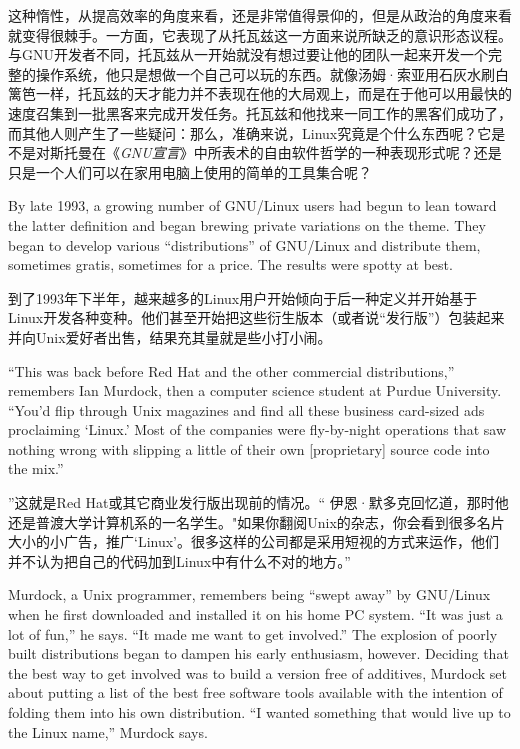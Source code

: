 \ifdefined\chs
这种惰性，从提高效率的角度来看，还是非常值得景仰的，但是从政治的角度来看就变得很棘手。一方面，它表现了从托瓦兹这一方面来说所缺乏的意识形态议程。与GNU开发者不同，托瓦兹从一开始就没有想过要让他的团队一起来开发一个完整的操作系统，他只是想做一个自己可以玩的东西。就像汤姆·索亚用石灰水刷白篱笆一样，托瓦兹的天才能力并不表现在他的大局观上，而是在于他可以用最快的速度召集到一批黑客来完成开发任务。托瓦兹和他找来一同工作的黑客们成功了，而其他人则产生了一些疑问：那么，准确来说，Linux究竟是个什么东西呢？它是不是对斯托曼在《\textit{GNU宣言}》中所表术的自由软件哲学的一种表现形式呢？还是只是一个人们可以在家用电脑上使用的简单的工具集合呢？
\fi

\ifdefined\eng
By late 1993, a growing number of GNU/Linux users had begun to lean toward the latter definition and began brewing private variations on the theme. They began to develop various ``distributions'' of GNU/Linux and distribute them, sometimes gratis, sometimes for a price. The results were spotty at best.
\fi

\ifdefined\chs
到了1993年下半年，越来越多的Linux用户开始倾向于后一种定义并开始基于Linux开发各种变种。他们甚至开始把这些衍生版本（或者说``发行版''）包装起来并向Unix爱好者出售，结果充其量就是些小打小闹。
\fi

\ifdefined\eng
``This was back before Red Hat and the other commercial distributions,'' remembers Ian Murdock, then a computer science student at Purdue University. ``You'd flip through Unix magazines and find all these business card-sized ads proclaiming `Linux.' Most of the companies were fly-by-night operations that saw nothing wrong with slipping a little of their own [proprietary] source code into the mix.''
\fi

\ifdefined\chs
''这就是Red Hat或其它商业发行版出现前的情况。`` 伊恩·默多克回忆道，那时他还是普渡大学计算机系的一名学生。"如果你翻阅Unix的杂志，你会看到很多名片大小的小广告，推广`Linux'。很多这样的公司都是采用短视的方式来运作，他们并不认为把自己的代码加到Linux中有什么不对的地方。''
\fi

\ifdefined\eng
Murdock, a Unix programmer, remembers being ``swept away'' by GNU/Linux when he first downloaded and installed it on his home PC system. ``It was just a lot of fun,'' he says. ``It made me want to get involved.'' The explosion of poorly built distributions began to dampen his early enthusiasm, however. Deciding that the best way to get involved was to build a version free of additives, Murdock set about putting a list of the best free software tools available with the intention of folding them into his own distribution. ``I wanted something that would live up to the Linux name,'' Murdock says.
\fi

